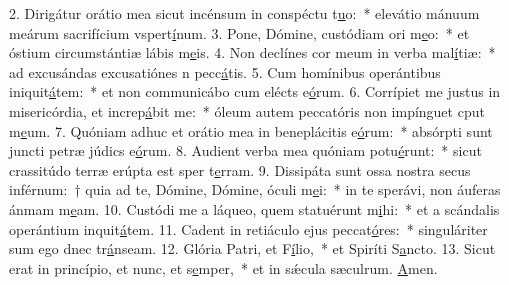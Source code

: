 2. Dirigátur orátio mea sicut incénsum in conspéctu t\uline{u}o:~* elevátio mánuum meárum sacrifícium vspert\uline{í}num.
3. Pone, Dómine, custódiam ori m\uline{e}o:~* et óstium circumstántiæ lábis m\uline{e}is.
4. Non declínes cor meum in verba mal\uline{í}tiæ:~* ad excusándas excusatiónes n pecc\uline{á}tis.
5. Cum homínibus operántibus iniquit\uline{á}tem:~* et non communicábo cum elécts e\uline{ó}rum.
6. Corrípiet me justus in misericórdia, et increp\uline{á}bit me:~* óleum autem peccatóris non impínguet cput m\uline{e}um.
7. Quóniam adhuc et orátio mea in beneplácitis e\uline{ó}rum:~* absórpti sunt juncti petræ júdics e\uline{ó}rum.
8. Audient verba mea quóniam potu\uline{é}runt:~* sicut crassitúdo terræ erúpta est sper t\uline{e}rram.
9. Dissipáta sunt ossa nostra secus inférnum:~† quia ad te, Dómine, Dómine, óculi m\uline{e}i:~* in te sperávi, non áuferas ánmam m\uline{e}am.
10. Custódi me a láqueo, quem statuérunt m\uline{i}hi:~* et a scándalis operántium inquit\uline{á}tem.
11. Cadent in retiáculo ejus peccat\uline{ó}res:~* singuláriter sum ego dnec tr\uline{á}nseam.
12. Glória Patri, et F\uline{í}lio,~* et Spiríti S\uline{a}ncto.
13. Sicut erat in princípio, et nunc, et s\uline{e}mper,~* et in sǽcula sæculrum. \uline{A}men.
